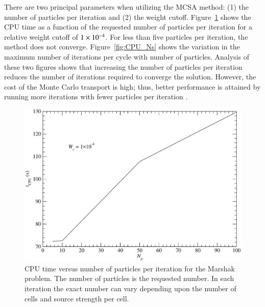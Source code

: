 \documentclass[preprint,12pt]{elsarticle}
\begin{document}
There are two principal parameters when utilizing the MCSA method: (1) the
number of particles per iteration and (2) the weight cutoff.
Figure~\ref{fig:CPU_Np} shows the CPU time as a function of the requested
number of particles per iteration for a relative weight cutoff of
$1\times 10^{-4}$.  For less than five particles per iteration, the method does not
converge.  Figure~\ref{fig:CPU_Ns} shows the variation in the maximum number
of iterations per cycle with number of particles.  Analysis of these two
figures shows that increasing the number of particles per iteration reduces
the number of iterations required to converge the solution.  However, the cost
of the Monte Carlo transport is high; thus, better performance is attained by
running more iterations with fewer particles per iteration \cite{evans_2003}.
\begin{figure}[ht!]
  \centerline{ \includegraphics[width=5in,clip]{mrshk_np_CPU.pdf}}
  \caption{CPU time versus number of particles per iteration for the
    Marshak problem.  The number of particles is the requested number.
    In each iteration the exact number can vary depending upon the number
    of cells and source strength per cell.}
  \label{fig:CPU_Np}
\end{figure}
\end{document}
